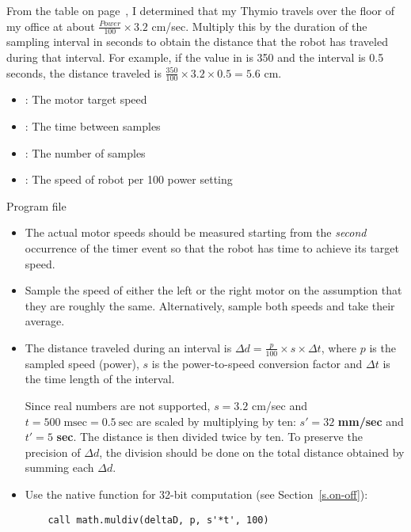 From the table on page~\pageref{tab.speed},
I determined that my Thymio travels over the floor of my office
at about $\frac{\mathit{Power}}{100}\times 3.2$ cm/sec. Multiply this by
the duration of the sampling interval in seconds to obtain the distance
that the robot has traveled during that interval. For example, if the
value in  is 350 and the interval is 0.5 seconds,
the distance traveled is $\frac{350}{100}\times 3.2 \times 0.5 = 5.6$ cm.


\begin{itemize}
\item {}: The motor target speed
\item {}: The time between samples
\item {}: The number of samples
\item {}: The speed of robot per 100 power setting
\end{itemize}


{\raggedleft \hfill Program file }

\begin{itemize}

\item The actual motor speeds should be measured starting from the \emph{second}
occurrence of the timer event so that the robot has time to achieve its target speed.

\item Sample the speed of either the left or the right motor on the assumption
that they are roughly the same. Alternatively, sample both speeds
and take their average.

\item The distance traveled during an interval is
$\Delta d=\frac{p}{100} \times s \times \Delta t$,
where $p$ is the sampled speed (power),
$s$ is the power-to-speed conversion factor and
$\Delta t$ is the time length of the interval.

Since real numbers are not supported,
$s=3.2$ cm/sec and $t=500 \; \textrm{msec} =0.5 \: \textrm{sec}$ are scaled
by multiplying by ten: $s'=32$ \textbf{mm/sec} and $t'=5$ \textbf{sec}.
The distance is then divided twice by ten.
To preserve the precision of $\Delta d$,
the division should be done on the total distance
obtained by summing each $\Delta d$.

\item Use the native function for 32-bit computation (see Section~\ref{s.on-off}):
\begin{verbatim}
    call math.muldiv(deltaD, p, s'*t', 100)
\end{verbatim}

\end{itemize}


